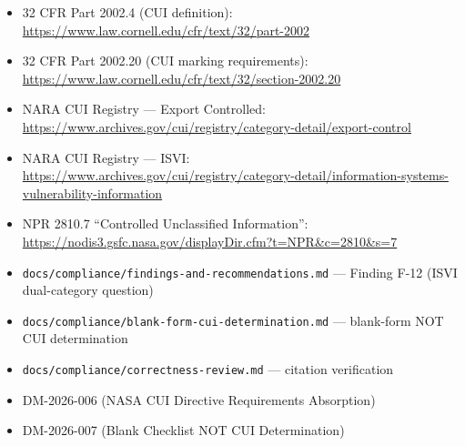 {\begin{enumerate}

\begin{itemize}
    \item 32 CFR Part 2002.4 (CUI definition): \url{https://www.law.cornell.edu/cfr/text/32/part-2002}
    \item 32 CFR Part 2002.20 (CUI marking requirements): \url{https://www.law.cornell.edu/cfr/text/32/section-2002.20}
    \item NARA CUI Registry --- Export Controlled: \url{https://www.archives.gov/cui/registry/category-detail/export-control}
    \item NARA CUI Registry --- ISVI: \url{https://www.archives.gov/cui/registry/category-detail/information-systems-vulnerability-information}
    \item NPR 2810.7 ``Controlled Unclassified Information'': \url{https://nodis3.gsfc.nasa.gov/displayDir.cfm?t=NPR&c=2810&s=7}
    \item \texttt{docs/compliance/findings-and-recommendations.md} --- Finding F-12 (ISVI dual-category question)
    \item \texttt{docs/compliance/blank-form-cui-determination.md} --- blank-form NOT CUI determination
    \item \texttt{docs/compliance/correctness-review.md} --- citation verification
    \item DM-2026-006 (NASA CUI Directive Requirements Absorption)
    \item DM-2026-007 (Blank Checklist NOT CUI Determination)
\end{itemize}

\end{enumerate}
}


